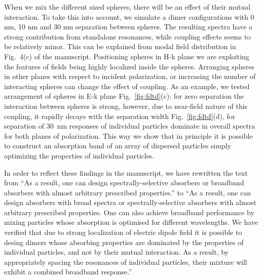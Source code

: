 \documentclass[a4paper]{article}
\begin{document}
When we mix the different sized spheres, there will be an effect of their mutual interaction. To take this into account, we simulate a dimer configurations with 0 nm, 10 nm and 30 nm separation between spheres.  The resulting spectra have a strong contribution from standalone resonances, while coupling effects seems to be relatively minor. This can be explained from modal field distribution in Fig.~4(c) of the manuscript. Positioning spheres in H-k plane we are exploiting the features of fields being highly localized inside the spheres. Arranging spheres in other planes with respect to incident polarization, or increasing the number of interacting spheres can change the effect of coupling. As an example, we tested arrangement of spheres in E-k plane Fig.~\ref{fig:fdtd}(c); for zero separation the interaction between spheres is strong, however, due to near-field nature of this coupling, it rapidly decays with the separation width Fig.~\ref{fig:fdtd}(d), for separation of 30~nm responses of individual particles dominate in overall spectra for both planes of polarization. This way we show that
in principle it is possible to construct an absorption band of an array of dispersed particles simply optimizing the properties of individual particles.

In order to reflect these findings in the manuscript, we have rewritten the text from ``As a result, one can design
spectrally-selective absorbers or broadband absorbers with almost arbitrary prescribed properties.'' to ``As a result, one can design absorbers with broad spectra or spectrally-selective absorbers with almost arbitrary prescribed properties.  One can also achieve broadband performance by mixing particles whose absorption is optimised for different wavelengths. We have verified that due to strong localization of electric dipole field it is possible to desing dimers whose absorbing properties are dominated by the properties of individual particles, and not by their mutual interaction. As a result, by appropriately spacing the resonances of individual particles, their mixture will exhibit a combined broadband response.''

\end{document}
